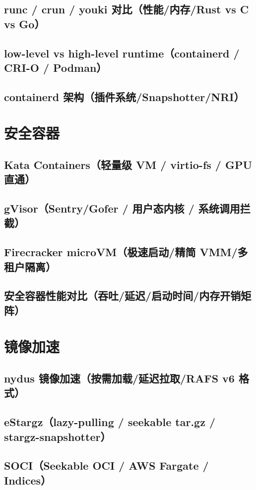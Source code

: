 \documentclass[12pt,UTF8]{ctexbook}
\begin{document}
    \subsection{runc / crun / youki 对比（性能/内存/Rust vs C vs Go）}
    \subsection{low-level vs high-level runtime（containerd / CRI-O / Podman）}
    \subsection{containerd 架构（插件系统/Snapshotter/NRI）}

  \section{安全容器}
    \subsection{Kata Containers（轻量级 VM / virtio-fs / GPU 直通）}
    \subsection{gVisor（Sentry/Gofer / 用户态内核 / 系统调用拦截）}
    \subsection{Firecracker microVM（极速启动/精简 VMM/多租户隔离）}
    \subsection{安全容器性能对比（吞吐/延迟/启动时间/内存开销矩阵）}

  \section{镜像加速}
    \subsection{nydus 镜像加速（按需加载/延迟拉取/RAFS v6 格式）}
    \subsection{eStargz（lazy-pulling / seekable tar.gz / stargz-snapshotter）}
    \subsection{SOCI（Seekable OCI / AWS Fargate / Indices）}
\end{document}
